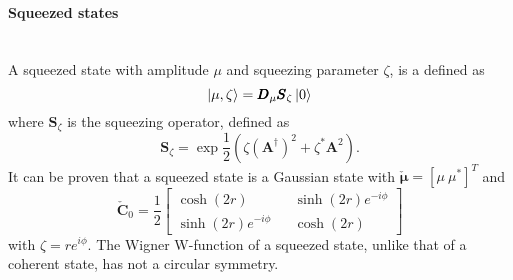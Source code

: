     \paragraph{Squeezed states}\mbox{} \\
    \label{squeezedStates}
    A squeezed state with amplitude $\mu$ and squeezing parameter $\zeta$, is a defined as 
    \cite{tesiGuerrini,YuenRadField,QMnoiseInterf}
    \begin{equation}
        \ket{\mu,\zeta}=\pmb{D}_\mu\pmb{S}_\zeta\ket{0}
    \end{equation}
    where $\pmb{S}_\zeta$ is the squeezing operator, defined as
    \begin{equation}
        \pmb{S}_\zeta=\exp{\frac{1}{2}\left(\zeta\left(\pmb{A}^\dagger\right)^2+
        \zeta^*\pmb{A}^2\right)}.
    \end{equation}
    It can be proven that a squeezed state is a Gaussian state with $\check{\pmb{\mu}}=[\mu\ \mu^*]^T$
    and
    \begin{equation*}
        \check{\pmb{C}}_0=\frac{1}{2}
        \begin{bmatrix}
            \cosh(2r) && \sinh(2r)e^{-i\phi}\\
            \sinh(2r)e^{-i\phi} && \cosh(2r)
        \end{bmatrix}
    \end{equation*}
    with $\zeta=re^{i\phi}$.
    The Wigner W-function of a squeezed state, unlike that of a coherent state, has not a 
    circular symmetry.

